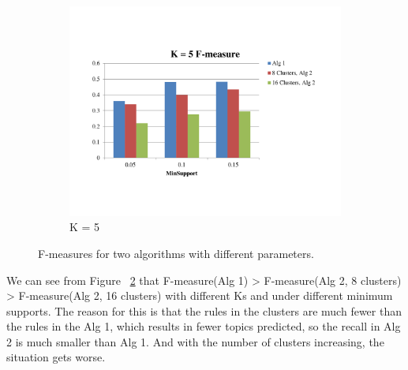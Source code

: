 \begin{figure}[b!]
\begin{subfigure}[b]{0.3\textwidth}
         \includegraphics[width=\textwidth]{F-measure5}
         \caption{K = 5}
         \label{Fig:F-measure5}
        \end{subfigure}
        \caption{F-measures for two algorithms with different parameters.}
        \label{Fig:F-measure}
\end{figure}

We can see from Figure ~\ref{Fig:F-measure} that F-measure(Alg 1) >
F-measure(Alg 2, 8 clusters) > F-measure(Alg 2, 16 clusters) with different Ks
and under different minimum supports. The reason for this is that  the rules in
the clusters are much fewer than the rules in the Alg 1, which results in fewer
topics predicted, so the recall in Alg 2 is much smaller than Alg 1. And with
the number of clusters increasing, the situation gets worse.
